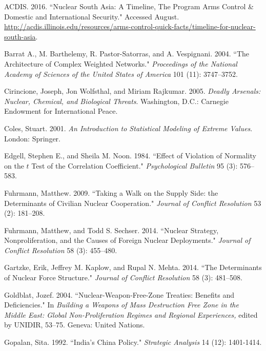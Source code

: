 \clearpage
\theendnotes

\clearpage
\begin{thebibliography}{1\kern\bibindent}

 ACDIS. 2016. ``Nuclear South Asia: A Timeline, The Program Arms Control {\&} Domestic and International Security." Accessed August. \url{http://acdis.illinois.edu/resources/arms-control-quick-facts/timeline-for-nuclear-south-asia}.

 Barrat A., M. Barthelemy, R. Pastor-Satorras, and A. Vespignani. 2004. ``The Architecture of Complex Weighted Networks." \textit{Proceedings of the National Academy of Sciences of the United States of America} 101 (11): 3747--3752.

 Cirincione, Joseph, Jon Wolfsthal, and Miriam Rajkumar. 2005. \textit{Deadly Arsenals: Nuclear, Chemical, and Biological Threats}. Washington, D.C.: Carnegie Endowment for International Peace.

 Coles, Stuart. 2001. \textit{An Introduction to Statistical Modeling of Extreme Values}. London: Springer.

  Edgell, Stephen E., and Sheila M. Noon. 1984. ``Effect of Violation of Normality on the $t$ Test of the Correlation Coefficient." \textit{Psychological Bulletin} 95 (3): 576--583.

 Fuhrmann, Matthew. 2009. ``Taking a Walk on the Supply Side: the Determinants of Civilian Nuclear Cooperation." \textit{Journal of Conflict Resolution} 53 (2): 181--208.

 Fuhrmann, Matthew, and Todd S. Sechser. 2014. ``Nuclear Strategy, Nonproliferation, and the Causes of Foreign Nuclear Deployments." \textit{Journal of Conflict Resolution} 58 (3): 455--480.

 Gartzke, Erik, Jeffrey M. Kaplow, and Rupal N. Mehta. 2014. ``The Determinants of Nuclear Force Structure." \textit{Journal of Conflict Resolution} 58 (3): 481--508.

 Goldblat, Jozef. 2004. ``Nuclear-Weapon-Free-Zone Treaties: Benefits and Deficiencies." In \textit{Building a Weapons of Mass Destruction Free Zone in the Middle East: Global Non-Proliferation Regimes and Regional Experiences,} edited by UNIDIR, 53--75. Geneva: United Nations.

 Gopalan, Sita. 1992. ``India's China Policy." \textit{Strategic Analysis} 14 (12): 1401-1414.


\end{thebibliography}
